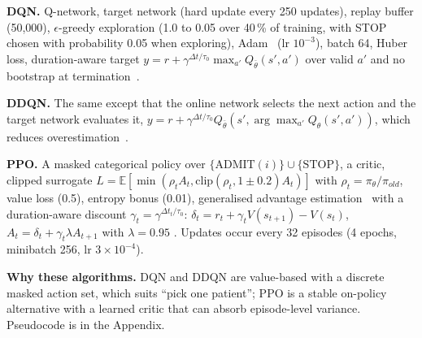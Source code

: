 \documentclass{rlreport}
\begin{document}
\textbf{DQN.} Q-network, target network (hard update every 250 updates), replay buffer (50{,}000), $\epsilon$-greedy exploration (1.0 to 0.05 over 40\,\% of training, with STOP chosen with probability 0.05 when exploring), Adam~\cite{kingma2015adam} (lr $10^{-3}$), batch 64, Huber loss, duration-aware target $y=r+\gamma^{\Delta t/\tau_0}\max_{a'}Q_{\bar\theta}(s',a')$ over valid $a'$ and no bootstrap at termination~\cite{mnih2015dqn}.

\textbf{DDQN.} The same except that the online network selects the next action and the target network evaluates it, $y=r+\gamma^{\Delta t/\tau_0}Q_{\bar\theta}(s',\arg\max_{a'}Q_\theta(s',a'))$, which reduces overestimation~\cite{vanhasselt2016ddqn}.

\textbf{PPO.} A masked categorical policy over $\{\mathrm{ADMIT}(i)\}\cup\{\mathrm{STOP}\}$, a critic, clipped surrogate $L=\mathbb E[\min(\rho_tA_t,\mathrm{clip}(\rho_t,1\pm0.2)A_t)]$ with $\rho_t=\pi_\theta/\pi_{old}$, value loss (0.5), entropy bonus (0.01), generalised advantage estimation~\cite{schulman2016gae} with a duration-aware discount $\gamma_t=\gamma^{\Delta t_t/\tau_0}$: $\delta_t=r_t+\gamma_tV(s_{t+1})-V(s_t)$, $A_t=\delta_t+\gamma_t\lambda A_{t+1}$ with $\lambda=0.95$ \cite{schulman2017ppo}. Updates occur every 32 episodes (4 epochs, minibatch 256, lr $3\times10^{-4}$).

\textbf{Why these algorithms.} DQN and DDQN are value-based with a discrete masked action set, which suits ``pick one patient''; PPO is a stable on-policy alternative with a learned critic that can absorb episode-level variance. Pseudocode is in the Appendix.
\end{document}
